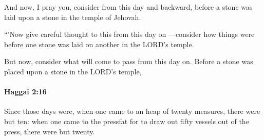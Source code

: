 			\begin{versebox}
					\item[BHS] 
					\item[LXX] 
					\item[ASV] And now, I pray you, consider from this day and backward, before a stone was laid upon a stone in the temple of Jehovah.
					\item[NIV] “’Now give careful thought to this from this day on —consider how things were before one stone was laid on another in the LORD’s temple.
					\item[NRSV] But now, consider what will come to pass from this day on. Before a stone was placed upon a stone in the LORD’s temple,
			\end{versebox}

		\paragraph{Haggai 2:16} %
			\label{HAGGAI-2-16}

			Since those days were, when one came to an heap of twenty measures, there were but ten: when one came to the pressfat for to draw out fifty vessels out of the press, there were but twenty.

